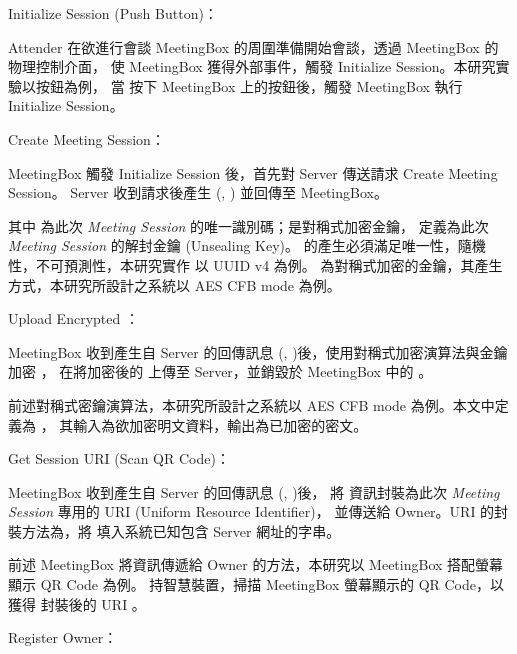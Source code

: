 \begin{steps}
    \item Initialize Session (Push Button)：

            Attender 在欲進行會談 MeetingBox 的周圍準備開始會談，\DEFattender 透過 MeetingBox 的物理控制介面，
        使 MeetingBox 獲得外部事件，觸發 Initialize Session。本研究實驗以按鈕為例，
        當 \DEFattender 按下 MeetingBox 上的按鈕後，觸發 MeetingBox 執行 Initialize Session。

    \item Create Meeting Session：

            MeetingBox 觸發 Initialize Session 後，首先對 Server 傳送請求 Create Meeting Session。
        Server 收到請求後產生 (\DEFsessionID, \DEFunsealKey) 並回傳至 MeetingBox。

            其中 \DEFsessionID 為此次 {\it Meeting Session} 的唯一識別碼；\DEFunsealKey 是對稱式加密金鑰，
        定義為此次 {\it Meeting Session} 的解封金鑰 (Unsealing Key)。
        \DEFsessionID 的產生必須滿足唯一性，隨機性，不可預測性，本研究實作 \DEFsessionID 以 UUID v4 為例。
        \DEFunsealKey 為對稱式加密的金鑰，其產生方式，本研究所設計之系統以 AES CFB mode 為例。

    \item Upload Encrypted \DEFrecN：

            MeetingBox 收到產生自 Server 的回傳訊息 (\DEFsessionID, \DEFunsealKey)後，使用對稱式加密演算法與金鑰 \DEFunsealKey 加密 \DEFrecN，
        在將加密後的 \DEFrecN 上傳至 Server，並銷毀於 MeetingBox 中的 \DEFunsealKey。

            前述對稱式密鑰演算法，本研究所設計之系統以 AES CFB mode 為例。本文中定義為 \DEFfuncEncEK，
        其輸入為欲加密明文資料，輸出為已加密的密文。

    \item Get Session URI (Scan QR Code)：

            MeetingBox 收到產生自 Server 的回傳訊息 (\DEFsessionID, \DEFunsealKey)後，
        將 \DEFsessionID 資訊封裝為此次 {\it Meeting Session} 專用的 URI (Uniform Resource Identifier)，
        並傳送給 Owner。URI 的封裝方法為，將 \DEFsessionID 填入系統已知包含 Server 網址的字串。

            前述 MeetingBox 將資訊傳遞給 Owner 的方法，本研究以 MeetingBox 搭配螢幕顯示 QR Code 為例。
        \DEFowner 持智慧裝置，掃描 MeetingBox 螢幕顯示的 QR Code，以獲得 \DEFsessionID 封裝後的 URI 。

    \item Register Owner：


\end{steps}
